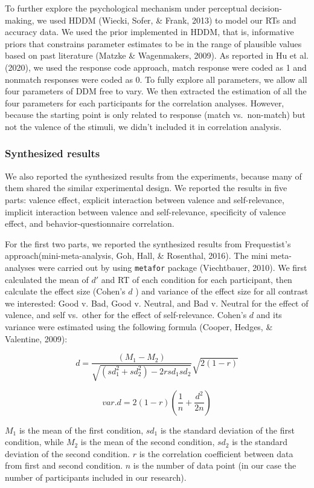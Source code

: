 \documentclass[
  english,
  man]{apa6}
\begin{document}
To further explore the psychological mechanism under perceptual decision-making, we used HDDM (Wiecki, Sofer, \& Frank, 2013) to model our RTs and accuracy data. We used the prior implemented in HDDM, that is, informative priors that constrains parameter estimates to be in the range of plausible values based on past literature (Matzke \& Wagenmakers, 2009). As reported in Hu et al. (2020), we used the response code approach, match response were coded as 1 and nonmatch responses were coded as 0. To fully explore all parameters, we allow all four parameters of DDM free to vary. We then extracted the estimation of all the four parameters for each participants for the correlation analyses. However, because the starting point is only related to response (match vs.~non-match) but not the valence of the stimuli, we didn't included it in correlation analysis.

\hypertarget{synthesized-results}{%
\subsubsection{Synthesized results}\label{synthesized-results}}

We also reported the synthesized results from the experiments, because many of them shared the similar experimental design. We reported the results in five parts: valence effect, explicit interaction between valence and self-relevance, implicit interaction between valence and self-relevance, specificity of valence effect, and behavior-questionnaire correlation.

For the first two parts, we reported the synthesized results from Frequestist's approach(mini-meta-analysis, Goh, Hall, \& Rosenthal, 2016). The mini meta-analyses were carried out by using \texttt{metafor} package (Viechtbauer, 2010). We first calculated the mean of \(d'\) and RT of each condition for each participant, then calculate the effect size (Cohen's \(d\) ) and variance of the effect size for all contrast we interested: Good v. Bad, Good v. Neutral, and Bad v. Neutral for the effect of valence, and self vs.~other for the effect of self-relevance. Cohen's \(d\) and its variance were estimated using the following formula (Cooper, Hedges, \& Valentine, 2009):

\[d = \frac {(M_{1} - M_{2})}{\sqrt {(sd_{1}^2 + sd_{2}^2) - 2rsd_{1}sd_{2}}}  \sqrt {2(1-r)}\]

\[var.d = 2 (1-r)  (\frac{1}{n} + \frac{d^2}{2n})\]

\(M_1\) is the mean of the first condition, \(sd_1\) is the standard deviation of the first condition, while \(M_2\) is the mean of the second condition, \(sd_2\) is the standard deviation of the second condition. \(r\) is the correlation coefficient between data from first and second condition. \(n\) is the number of data point (in our case the number of participants included in our research).
\end{document}
